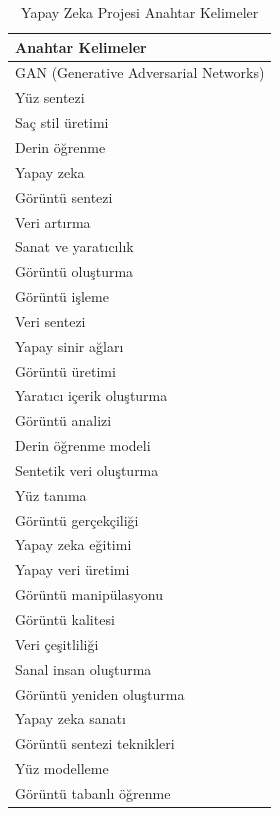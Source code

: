 \documentclass[12pt]{article}
\begin{document}
\begin{table}[htbp]
\centering
\begin{tabular}{|p{1.0\linewidth}|}
\hline
\textbf{Anahtar Kelimeler} \\
\hline
GAN (Generative Adversarial Networks) \\
Yüz sentezi \\
Saç stil üretimi \\
Derin öğrenme \\
Yapay zeka \\
Görüntü sentezi \\
Veri artırma \\
Sanat ve yaratıcılık \\
Görüntü oluşturma \\
Görüntü işleme \\
Veri sentezi \\
Yapay sinir ağları \\
Görüntü üretimi \\
Yaratıcı içerik oluşturma \\
Görüntü analizi \\
Derin öğrenme modeli \\
Sentetik veri oluşturma \\
Yüz tanıma \\
Görüntü gerçekçiliği \\
Yapay zeka eğitimi \\
Yapay veri üretimi \\
Görüntü manipülasyonu \\
Görüntü kalitesi \\
Veri çeşitliliği \\
Sanal insan oluşturma \\
Görüntü yeniden oluşturma \\
Yapay zeka sanatı \\
Görüntü sentezi teknikleri \\
Yüz modelleme \\
Görüntü tabanlı öğrenme \\
\hline
\end{tabular}
\caption{Yapay Zeka Projesi Anahtar Kelimeler}
\label{tab:anahtar-kelimeler}
\end{table}
\end{document}
